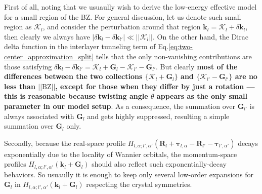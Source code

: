 First of all, noting that we usuaully wish to derive the low-energy effective model for a small region of the BZ. For general discussion, let us denote such small region as $\bm{\mathcal K}_l$, and consider the perturbation around that region $\bm k_l=\bm{\mathcal K}_l+\delta\bm k_l$, then clearly we always have $|\delta\bm k_l-\delta\bm k_{l'}|\ll||\bm{\mathcal K}_l||$. On the other hand, the Dirac delta function in the interlayer tunneling term of Eq.\eqref{eq:two-center_approximation_split} tells that the only non-vanishing contributions are those satisfying $\delta\bm k_l-\delta\bm k_{l'}=\bm{\mathcal K}_l+\bm G_l-\bm{\mathcal K}_{l'}-\bm G_{l'}$. But clearly \textbf{most of the differences between the two collections $\{\bm{\mathcal K}_l+\bm G_l\}$ and $\{\bm{\mathcal K}_{l'}-\bm G_{l'}\}$ are no less than $||\text{BZ}||$, except for those when they differ by just a rotation --- this is reasonable because twisting angle $\theta$ appears as the only small parameter in our model setup}. As a consequence, the summation over $\bm G_{l'}$ is always associated with $\bm G_l$ and gets highly suppressed, resulting a simple summation over $\bm G_l$ only.

Secondly, because the real-space profile $H_{l,\alpha;l',\alpha'}(\bm R_l+\bm\tau_{l,\alpha}-\bm R_{l'}-\bm\tau_{l',\alpha'})$ decays exponentially due to the locality of Wannier orbitals, the momentum-space profiles $H_{l,\alpha;l',\alpha'}(\bm k_l+\bm G_l)$ should also reflect such exponentially-decay behaviors. So usuaully it is enough to keep only several low-order expansions for $\bm G_l$ in $H_{l,\alpha;l',\alpha'}(\bm k_l+\bm G_l)$ respecting the crystal symmetries.


